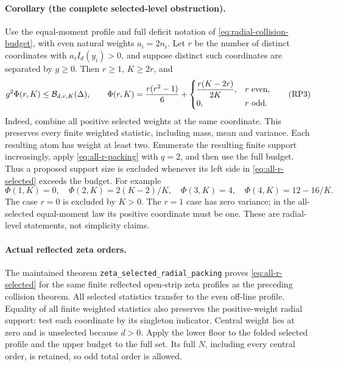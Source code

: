 \paragraph{Corollary (the complete selected-level obstruction).}
Use the equal-moment profile and full deficit notation of
\eqref{eq:radial-collision-budget}, with even natural weights \(a_i=2n_i\).
Let \(r\) be the number of distinct coordinates with
\(a_iI_d(y_i)>0\), and suppose distinct such coordinates are separated
by \(g\ge0\). Then \(r\ge1\), \(K\ge2r\), and
\begin{equation}
 g^2\Phi(r,K)\le {\cal B}_{d,v,K}(\Delta),\qquad
 \Phi(r,K)=\frac{r(r^2-1)}6+
 \begin{cases}\dfrac{r(K-2r)}{2K},&r\text{ even},\\0,&r\text{ odd}.\end{cases}
 \tag{RP3}\label{eq:all-r-selected}
\end{equation}
Indeed, combine all positive selected weights at the same coordinate.
This preserves every finite weighted statistic, including mass, mean
and variance. Each resulting atom has weight at least two.
Enumerate the resulting finite support increasingly, apply
\eqref{eq:all-r-packing} with \(q=2\), and then use the full budget.
Thus a proposed support size is excluded whenever its left side in
\eqref{eq:all-r-selected} exceeds the budget. For example
\[
 \Phi(1,K)=0,\quad \Phi(2,K)=2(K-2)/K,\quad
 \Phi(3,K)=4,\quad \Phi(4,K)=12-16/K.
\]
The case \(r=0\) is excluded by \(K>0\). The \(r=1\) case has zero
variance; in the all-selected equal-moment law its positive coordinate
must be one. These are radial-level statements, not simplicity claims.

\paragraph{Actual reflected zeta orders.}
The maintained theorem \texttt{zeta\_selected\_radial\_packing}
proves \eqref{eq:all-r-selected} for the same finite reflected
open-strip zeta profiles as the preceding collision theorem.
All selected statistics transfer to the even off-line profile.
Equality of all finite weighted statistics also preserves the
positive-weight radial support: test each coordinate by its singleton
indicator. Central weight lies at zero and is unselected because \(d>0\).
Apply the lower floor to the folded selected profile and the upper
budget to the full set. Its full \(N\), including every central order,
is retained, so odd total order is allowed.

